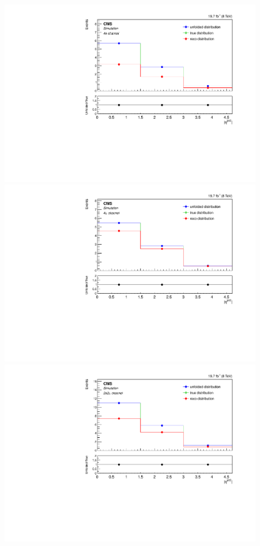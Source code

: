 \begin{figure}[hbtp]
  \begin{center}
    \includegraphics[width=0.8\cmsFigWidth]{Figures/Unfolding/MCTests/EtaJet2_ZZTo4e_MadMatrix_MadDistr_FullSample_fr}     
    \includegraphics[width=0.8\cmsFigWidth]{Figures/Unfolding/MCTests/EtaJet2_ZZTo4m_MadMatrix_MadDistr_FullSample_fr}     
    \includegraphics[width=0.8\cmsFigWidth]{Figures/Unfolding/MCTests/EtaJet2_ZZTo2e2m_MadMatrix_MadDistr_FullSample_fr}

\end{center}
\end{figure}
